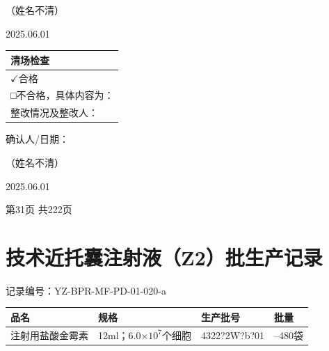 \documentclass[UTF8,10pt,a4paper,fontset=fandol]{ctexart}
\newcommand{\fieldvalue}[1]{#1}
\newcommand{\handwritten}[1]{#1}
\let\mathcheckmark\checkmark
\renewcommand{\checkmark}{\ensuremath{\mathcheckmark}}
\begin{document}
\fieldvalue{\handwritten{（姓名不清）}}
\quad

\fieldvalue{\handwritten{2025.06.01}}

\vspace{0.5em}

\begin{tabularx}{\textwidth}{|X|}
\hline
清场检查 \\ \hline
\fieldvalue{\handwritten{\checkmark}}合格 \\ \hline
□不合格，具体内容为： \\[1.8em] \hline
整改情况及整改人： \\[1.8em] \hline
\end{tabularx}

\vspace{0.5em}

\noindent
确认人/日期：

\fieldvalue{\handwritten{（姓名不清）}}
\quad

\fieldvalue{\handwritten{2025.06.01}}

\vfill

\begin{center}
第31页 共222页
\end{center}

\newpage

\section*{技术近托囊注射液（Z2）批生产记录}

\noindent
记录编号：YZ-BPR-MF-PD-01-020-a

\begin{tabularx}{\textwidth}{|>{\centering\arraybackslash}X|>{\centering\arraybackslash}X|>{\centering\arraybackslash}X|>{\centering\arraybackslash}X|}
\hline
品名 & 规格 & 生产批号 & 批量 \\
\hline
注射用盐酸金霉素 & 12ml；6.0$\times 10^7$个细胞 &
\fieldvalue{\handwritten{4322?2W?b?01}} &
200--480袋 \\
\hline
\end{tabularx}
\end{document}
